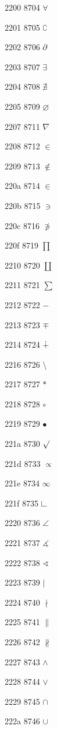 \documentclass[11pt]{article}
\begin{document}
2200 8704 \ensuremath{\forall}

2201 8705 \ensuremath{\complement}

2202 8706 \ensuremath{\partial}

2203 8707 \ensuremath{\exists}

2204 8708 \ensuremath{\nexists}

2205 8709 \ensuremath{\varnothing}

2207 8711 \ensuremath{\nabla}

2208 8712 \ensuremath{\in}

2209 8713 \ensuremath{\notin}

220a 8714 \ensuremath{\in}

220b 8715 \ensuremath{\ni}

220c 8716 \ensuremath{\not\ni}

220f 8719 \ensuremath{\prod}

2210 8720 \ensuremath{\coprod}

2211 8721 \ensuremath{\sum}

2212 8722 \ensuremath{\minus}

2213 8723 \ensuremath{\mp}

2214 8724 \ensuremath{\dotplus}

2216 8726 \ensuremath{\setminus}

2217 8727 \ensuremath{\ast}

2218 8728 \ensuremath{\circ}

2219 8729 \ensuremath{\bullet}

221a 8730 \ensuremath{\surd}

221d 8733 \ensuremath{\propto}

221e 8734 \ensuremath{\infty}

221f 8735 \ensuremath{\rightangle}

2220 8736 \ensuremath{\angle}

2221 8737 \ensuremath{\measuredangle}

2222 8738 \ensuremath{\sphericalangle}

2223 8739 \ensuremath{\mid}

2224 8740 \ensuremath{\nmid}

2225 8741 \ensuremath{\parallel}

2226 8742 \ensuremath{\nparallel}

2227 8743 \ensuremath{\wedge}

2228 8744 \ensuremath{\vee}

2229 8745 \ensuremath{\cap}

222a 8746 \ensuremath{\cup}
\end{document}
